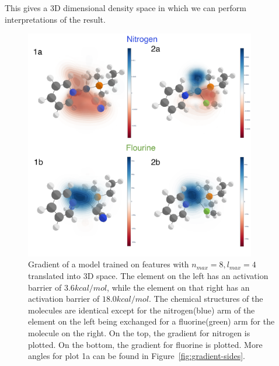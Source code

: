 This gives a 3D dimensional density space in which we can perform interpretations of the result. 
\begin{figure}
  \centering
  \includegraphics[width=0.9\textwidth]{figures/evaluation/GradientComp.png}
  \caption{
      Gradient of a model trained on features with $n_{max}=8, l_{max}=4$ translated into 3D space.
      The element on the left has an activation barrier of $3.6 kcal/mol$, while the element on that right
      has an activation barrier of $18.0 kcal/mol$.
      The chemical structures of the molecules are identical except for the nitrogen(blue) arm of the element
      on the left being exchanged for a fluorine(green) arm for the molecule on the right.
      On the top, the gradient for nitrogen is plotted. On the bottom, the gradient for fluorine is plotted.
      More angles for plot 1a can be found in Figure~\ref{fig:gradient-sides}.
   }
  \label{fig:snap-gradient}
\end{figure}

